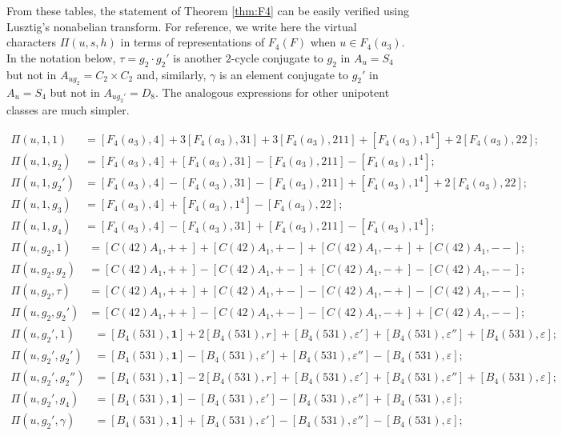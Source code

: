 From these tables, the statement of Theorem \ref{thm:F4} can be easily verified using Lusztig's nonabelian transform. For reference, we write here the virtual characters $\Pi(u,s,h)$ in terms of representations of $F_4(F)$ when $u\in F_4(a_3)$. In the notation below, $\tau=g_2\cdot g_2'$ is another $2$-cycle conjugate to $g_2$ in $A_u=S_4$ but not in $A_{ug_2}=C_2\times C_2$ and, similarly, $\gamma$ is an element conjugate to $g_2'$ in $A_u=S_4$ but not in $A_{ug_2'}=D_8$. The analogous expressions for other unipotent classes are much simpler. 

\begin{align*}
    \Pi(u,1,1)&= [F_4(a_3),4] + 3[F_4(a_3),31] + 3[F_4(a_3),211] + [F_4(a_3),1^4] + 2[F_4(a_3),22]; \\
    \Pi(u, 1, g_2) &= [F_4(a_3),4] + [F_4(a_3),31] - [F_4(a_3),211] - [F_4(a_3),1^4]; \\
    \Pi(u, 1, g_2') &= [F_4(a_3),4] - [F_4(a_3),31] - [F_4(a_3),211] + [F_4(a_3),1^4] + 2[F_4(a_3),22]; \\
    \Pi(u, 1, g_3) &= [F_4(a_3),4] + [F_4(a_3),1^4] - [F_4(a_3),22]; \\
    \Pi(u, 1, g_4) &= [F_4(a_3),4] - [F_4(a_3),31] + [F_4(a_3),211] - [F_4(a_3),1^4]; 
\end{align*}
\begin{align*}
    \Pi(u, g_2, 1) &= [C(42)A_1,++] + [C(42)A_1,+-] + [C(42)A_1,-+] + [C(42)A_1,--]; \\
    \Pi(u, g_2, g_2) &= [C(42)A_1,++] - [C(42)A_1,+-] + [C(42)A_1,-+] - [C(42)A_1,--]; \\
    \Pi(u, g_2, \tau) &= [C(42)A_1,++] + [C(42)A_1,+-] - [C(42)A_1,-+] - [C(42)A_1,--]; \\
    \Pi(u, g_2, g_2') &= [C(42)A_1,++] - [C(42)A_1,+-] - [C(42)A_1,-+] + [C(42)A_1,--]; 
\end{align*}
\begin{align*}
    \Pi(u,g_2',1) &= [B_4(531),\mathbf{1}] + 2[B_4(531),r] + [B_4(531),\varepsilon'] + [B_4(531),\varepsilon''] + [B_4(531),\varepsilon]; \\
    \Pi(u, g_2', g_2') &= [B_4(531),\mathbf{1}] - [B_4(531),\varepsilon'] + [B_4(531),\varepsilon''] - [B_4(531),\varepsilon]; \\
    \Pi(u, g_2', g_2'') &= [B_4(531),\mathbf{1}] - 2[B_4(531),r] + [B_4(531),\varepsilon'] + [B_4(531),\varepsilon''] + [B_4(531),\varepsilon]; \\
    \Pi(u, g_2', g_4) &= [B_4(531),\mathbf{1}] - [B_4(531),\varepsilon'] - [B_4(531),\varepsilon''] + [B_4(531),\varepsilon]; \\
    \Pi(u, g_2', \gamma) &= [B_4(531),\mathbf{1}] + [B_4(531),\varepsilon'] - [B_4(531),\varepsilon''] - [B_4(531),\varepsilon];
\end{align*}
